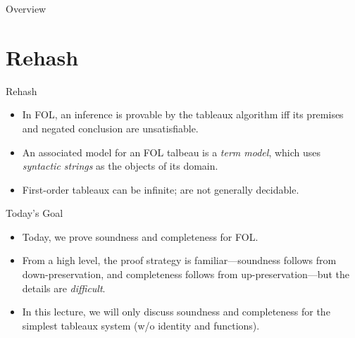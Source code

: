 \begin{frame}
  \maketitle
\end{frame}

\begin{frame}{Overview}
  \setcounter{framenumber}{321}
  \tableofcontents
\end{frame}

\section{Rehash}
\begin{frame}{Rehash}
	
	\begin{itemize}%
	\itemsep=16pt
	
	\item In FOL, an inference is provable by the tableaux algorithm iff its premises and negated conclusion are unsatisfiable.
                  		
	\item An associated model for an FOL talbeau is a \emph{term model}, which uses \emph{syntactic strings} as the objects of its domain.
		
	\item First-order tableaux can be infinite; are not generally decidable.
		
					
	\end{itemize}

\end{frame}
		
\begin{frame}{Today's Goal}

	\begin{itemize}%
	\itemsep=16pt
		
        \item Today, we prove soundness and completeness for FOL.
        
        \item From a high level, the proof strategy is familiar---soundness follows from down-preservation, and completeness follows from up-preservation---but the details are \emph{difficult}.

	\item In this lecture, we will only discuss soundness and completeness for the simplest tableaux system (w/o identity and functions). 
          
	\end{itemize}

\end{frame}


